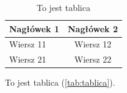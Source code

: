 \documentclass[language=polish,type=master]{aghmodern}
\begin{document}
\begin{table}[t]
	\centering

	\begin{tabular}{l c}
		\toprule
		Nagłówek 1 & Nagłówek 2 \\ \midrule
		Wiersz 11 & Wiersz 12 \\
		Wiersz 21 & Wiersz 22 \\
		\bottomrule
	\end{tabular}
	\caption{To jest tablica}
	\label{tab:tablica}
\end{table}

\lipsum

To jest tablica (\autoref{tab:tablica}).

\backmatter

\cleardoublepage
\listoffigures

\cleardoublepage
\listoftables

\cleardoublepage
\printbibliography
\end{document}
